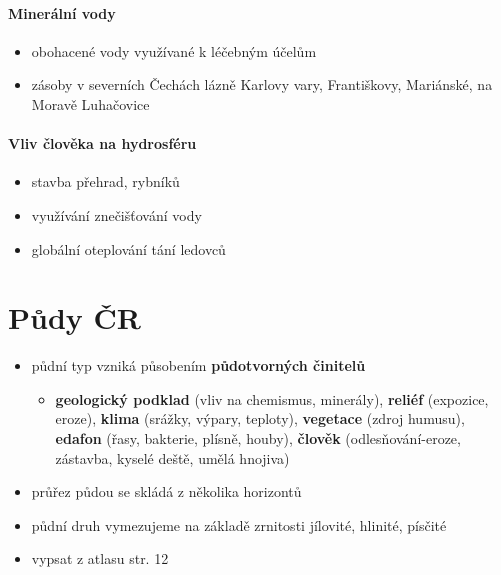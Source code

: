 \paragraph{Minerální vody}
\begin{itemize}
\item obohacené vody využívané k léčebným účelům
\item zásoby v severních Čechách \ra lázně Karlovy vary, Františkovy, Mariánské, na Moravě Luhačovice
\end{itemize}

\paragraph{Vliv člověka na hydrosféru}
\begin{itemize}
\item stavba přehrad, rybníků
\item využívání \ra znečišťování vody
\item globální oteplování \ra tání ledovců
\end{itemize}

\section{Půdy ČR}
\begin{itemize}
\item půdní typ vzniká působením \textbf{půdotvorných činitelů}
	\begin{itemize}
	\item \textbf{geologický podklad} (vliv na chemismus, minerály), \textbf{reliéf} (expozice, eroze), \textbf{klima} (srážky, výpary, teploty), \textbf{vegetace} (zdroj humusu), \textbf{edafon} (řasy, bakterie, plísně, houby), \textbf{člověk} (odlesňování-eroze, zástavba, kyselé deště, umělá hnojiva)
	\end{itemize}
\item průřez půdou se skládá z několika horizontů
\item půdní druh vymezujeme na základě zrnitosti \ra jílovité, hlinité, písčité
\item vypsat z atlasu str. 12
\end{itemize}


